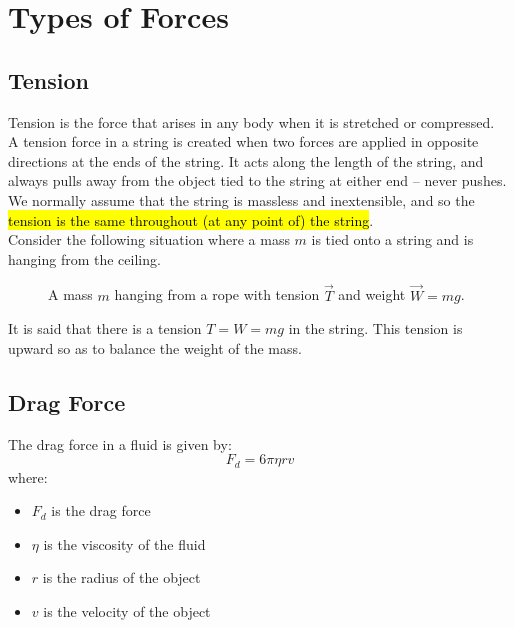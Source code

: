 \documentclass[a4paper,12pt]{article}
\let\oldsection\section
\renewcommand\section{\clearpage\oldsection}
\newcommand{\lb}{\\[8pt]}
\begin{document}
\section{Types of Forces}

\subsection{Tension}

Tension is the force that arises in any body when it is stretched or
compressed.\lb
A tension force in a string is created when two forces are applied in opposite directions at the ends of the string. It acts along the length of the string, and always pulls away from the object tied to the string at either end -- never pushes.\lb
We normally assume that the string is massless and inextensible, and so the \hl{tension is the same throughout (at any point of) the string}.\lb
Consider the following situation where a mass $m$ is tied onto a string and is hanging from the ceiling.

\begin{figure}[H]
  \centering
  \caption{A mass \( m \) hanging from a rope with tension \( \vec{T} \) and weight \( \vec{W} = mg \).}
\end{figure}
\bigskip
It is said that there is a tension $T = W = mg$ in the string. This tension is upward so as to balance the weight of the mass.

\pagebreak

\subsection{Drag Force}

The drag force in a fluid is given by:
$$F_d = 6\pi \eta r v$$
where:
\begin{itemize}
  \item $F_d$ is the drag force
  \item $\eta$ is the viscosity of the fluid
  \item $r$ is the radius of the object
  \item $v$ is the velocity of the object
\end{itemize}
\end{document}
